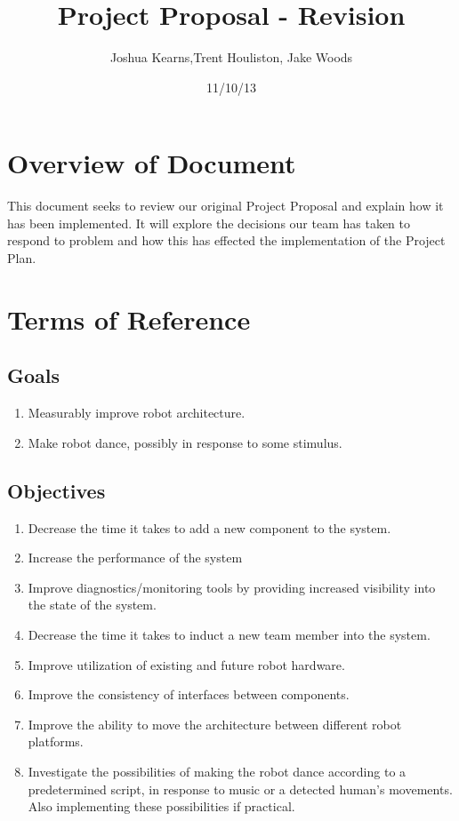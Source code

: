 \documentclass[a4paper]{article}
\title{Project Proposal - Revision}
\author{Joshua Kearns,Trent Houliston, Jake Woods}
\date{11/10/13}
\begin{document}
	\maketitle
	
	\clearpage
	\tableofcontents
	\clearpage

	\section{Overview of Document}
	This document seeks to review our original Project Proposal and explain how it has been implemented. It will explore the decisions our team has taken to respond to problem and how this has effected the implementation of the Project Plan.

	\section{Terms of Reference}
		\subsection {Goals}
			\begin{enumerate}
				\item Measurably improve robot architecture.
				\item Make robot dance, possibly in response to some stimulus.
			\end{enumerate}
		\subsection {Objectives}
			\begin{enumerate}
				\item Decrease the time it takes to add a new component to the system.
				\item Increase the performance of the system
				\item Improve diagnostics/monitoring tools by providing increased visibility into the state of the system.
				\item Decrease the time it takes to induct a new team member into the system.
				\item Improve utilization of existing and future robot hardware.
				\item Improve the consistency of interfaces between components.
				\item Improve the ability to move the architecture between different robot platforms.
				\item Investigate the possibilities of making the robot dance according to a predetermined script, in response to music or a detected human’s movements. Also implementing these possibilities if practical.
			\end{enumerate}
\end{document}
